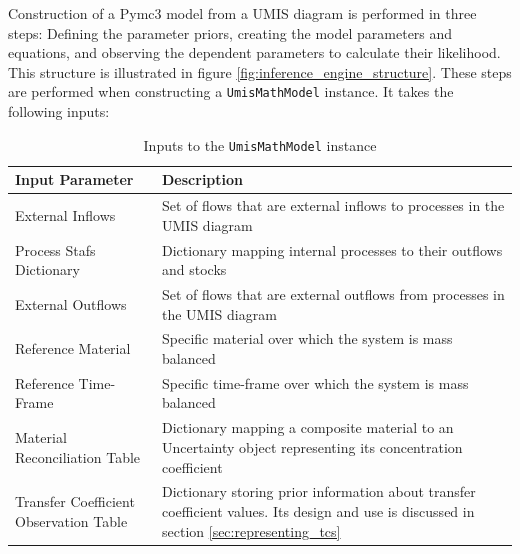 \documentclass[ %
                    author={Tom Jager},
                supervisor={Dr. Daniel Schien},
                    degree={MEng},
                     title={A Bayesian Inference Engine for Calibrating Uncertainty over UMIS Structured MFA Systems},
                  subtitle={},
                      type={research},
                      year={2019} ]{dissertation}
\begin{document}

Construction of a Pymc3 model from a UMIS diagram is performed in three steps: Defining the parameter priors, creating the model parameters and equations, and observing the dependent parameters to calculate their likelihood. This structure is illustrated in figure \ref{fig:inference_engine_structure}. These steps are performed when constructing a \texttt{UmisMathModel} instance. It takes the following inputs:

\begin{table}[h!]
\begin{tabular}{|p{6cm}|p{9cm}|}
\hline
\textbf{Input Parameter}               & \textbf{Description}                                                                                                                      \\ \hline
External Inflows                       & Set of flows that are external inflows to processes in the UMIS diagram                                                                   \\ \hline
Process Stafs Dictionary               & Dictionary mapping internal processes to their outflows and stocks                                                                        \\ \hline
External Outflows                      & Set of flows that are external outflows from processes in the UMIS diagram                                                                \\ \hline
Reference Material                     & Specific material over which the system is mass balanced                                                                                  \\ \hline
Reference Time-Frame                   & Specific time-frame over which the system is mass balanced                                                                                \\ \hline
Material Reconciliation Table          & Dictionary mapping a composite material to an Uncertainty \mbox{object} representing its concentration coefficient                               \\ \hline
Transfer Coefficient Observation Table & Dictionary storing prior information about transfer \mbox{coefficient} \mbox{values}. Its design and use is discussed in \mbox{section} \ref{sec:representing_tcs} \\ \hline
\end{tabular}
\caption{Inputs to the \texttt{UmisMathModel} instance}
\label{tab:math_model_inputs}
\end{table}
\end{document}
